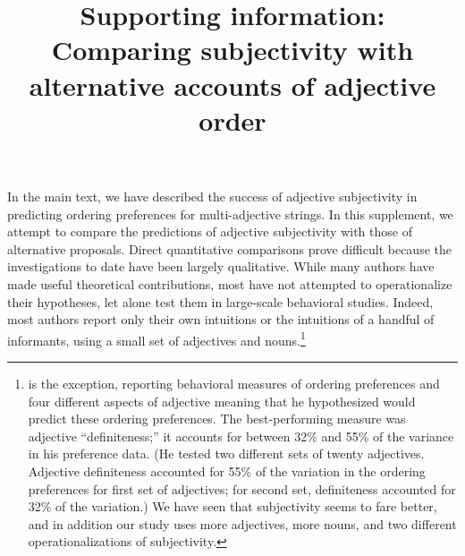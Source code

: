 \documentclass[12pt]{article}
\title{Supporting information: Comparing subjectivity with alternative accounts of adjective order}
\date{}
\begin{document}
\maketitle

In the main text, we have described the success of adjective subjectivity in predicting ordering preferences for multi-adjective strings. In this supplement, we attempt to compare the predictions of adjective subjectivity with those of alternative proposals. Direct quantitative comparisons prove difficult because the investigations to date have been largely qualitative. 
While many authors have made useful theoretical contributions,
most have not attempted to operationalize their hypotheses, let alone test them in large-scale behavioral studies.
Indeed, most authors report only their own intuitions or the intuitions of a handful of informants, using a small set of adjectives and nouns.\footnote{\citet{martin1969} is the exception, reporting behavioral measures of ordering preferences and four different aspects of adjective meaning that he hypothesized would predict these ordering preferences. The best-performing measure was adjective ``definiteness;'' it accounts for between 32\% and 55\% of the variance in his preference data. (He tested two different sets of twenty adjectives. Adjective definiteness accounted for 55\% of the variation in the ordering preferences for first set of adjectives; for second set, definiteness accounted for 32\% of the variation.) We have seen that subjectivity seems to fare better, and in addition our study uses more adjectives, more nouns, and two different operationalizations of subjectivity.} 

\end{document}
